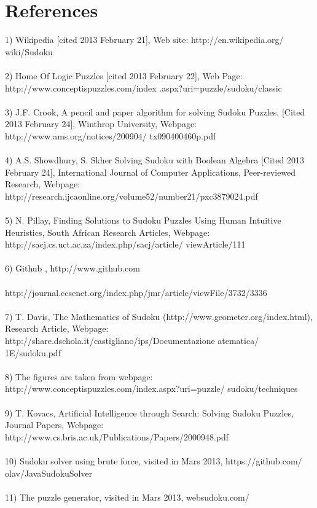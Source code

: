\documentclass[12pt, letterpaper]{article}
\begin{document}
    \section{References}
    1) Wikipedia [cited 2013 February 21], Web site: http://en.wikipedia.org/
    wiki/Sudoku \\ \\
    2) Home Of Logic Puzzles [cited 2013 February 22], Web Page:
    http://www.conceptispuzzles.com/\newline index  .aspx?uri=puzzle/sudoku/classic\\ \\
    3) J.F. Crook, A pencil and paper algorithm for solving Sudoku Puzzles, [Cited 2013
    February 24], Winthrop University, Webpage:
    http://www.ams.org/notices/200904/ \newline tx090400460p.pdf\\ \\
    4) A.S. Showdhury, S. Skher Solving Sudoku with Boolean Algebra [Cited 2013 February
    24], International Journal of Computer Applications, Peer-reviewed Research, Webpage:
    http://research.ijcaonline.org/volume52/number21/pxc3879024.pdf \\ \\
    5) N. Pillay, Finding Solutions to Sudoku Puzzles Using Human Intuitive Heuristics, South
    African Research Articles, Webpage:
    http://sacj.cs.uct.ac.za/index.php/\newline sacj/article/  viewArticle/111\\ \\
    6) Github , http://www.github.com \\ \\
    http://journal.ccsenet.org/index.php/jmr/article/viewFile/3732/3336\\ \\
    7) T. Davis, The Mathematics of Sudoku (http://www.geometer.org/index.html), Research
    Article, Webpage:
    http://share.dschola.it/castigliano/ips/Documentazione%
    atematica/ \newline 1E/sudoku.pdf\\ \\
    8) The figures are taken from webpage:
    http://www.conceptispuzzles.com/index.aspx?uri=puzzle/ \newline sudoku/techniques\\ \\
    9) T. Kovacs, Artificial Intelligence through Search: Solving Sudoku Puzzles, Journal Papers,
    Webpage: http://www.cs.bris.ac.uk/Publications/Papers/2000948.pdf\\ \\
    10) Sudoku solver using brute force, visited in Mars 2013,
    https://github.com/ \newline olav/JavaSudokuSolver\\ \\
    11) The puzzle generator, visited in Mars 2013, websudoku.com/\\ \\

	
	
\end{document}
